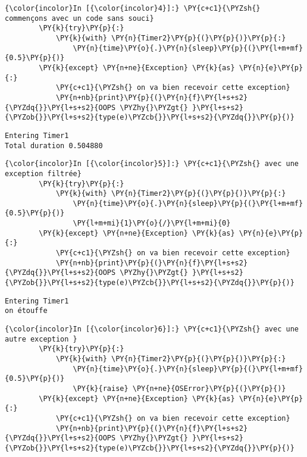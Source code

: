     \begin{Verbatim}[commandchars=\\\{\},frame=single,framerule=0.3mm,rulecolor=\color{cellframecolor}]
{\color{incolor}In [{\color{incolor}4}]:} \PY{c+c1}{\PYZsh{} commençons avec un code sans souci}
        \PY{k}{try}\PY{p}{:}
            \PY{k}{with} \PY{n}{Timer2}\PY{p}{(}\PY{p}{)}\PY{p}{:}
                \PY{n}{time}\PY{o}{.}\PY{n}{sleep}\PY{p}{(}\PY{l+m+mf}{0.5}\PY{p}{)}
        \PY{k}{except} \PY{n+ne}{Exception} \PY{k}{as} \PY{n}{e}\PY{p}{:}
            \PY{c+c1}{\PYZsh{} on va bien recevoir cette exception}
            \PY{n+nb}{print}\PY{p}{(}\PY{n}{f}\PY{l+s+s2}{\PYZdq{}}\PY{l+s+s2}{OOPS \PYZhy{}\PYZgt{} }\PY{l+s+s2}{\PYZob{}}\PY{l+s+s2}{type(e)\PYZcb{}}\PY{l+s+s2}{\PYZdq{}}\PY{p}{)}
\end{Verbatim}


    \begin{Verbatim}[commandchars=\\\{\},frame=single,framerule=0.3mm,rulecolor=\color{cellframecolor}]
Entering Timer1
Total duration 0.504880
\end{Verbatim}

    \begin{Verbatim}[commandchars=\\\{\},frame=single,framerule=0.3mm,rulecolor=\color{cellframecolor}]
{\color{incolor}In [{\color{incolor}5}]:} \PY{c+c1}{\PYZsh{} avec une exception filtrée}
        \PY{k}{try}\PY{p}{:}
            \PY{k}{with} \PY{n}{Timer2}\PY{p}{(}\PY{p}{)}\PY{p}{:}
                \PY{n}{time}\PY{o}{.}\PY{n}{sleep}\PY{p}{(}\PY{l+m+mf}{0.5}\PY{p}{)}
                \PY{l+m+mi}{1}\PY{o}{/}\PY{l+m+mi}{0}
        \PY{k}{except} \PY{n+ne}{Exception} \PY{k}{as} \PY{n}{e}\PY{p}{:}
            \PY{c+c1}{\PYZsh{} on va bien recevoir cette exception}
            \PY{n+nb}{print}\PY{p}{(}\PY{n}{f}\PY{l+s+s2}{\PYZdq{}}\PY{l+s+s2}{OOPS \PYZhy{}\PYZgt{} }\PY{l+s+s2}{\PYZob{}}\PY{l+s+s2}{type(e)\PYZcb{}}\PY{l+s+s2}{\PYZdq{}}\PY{p}{)}
\end{Verbatim}


    \begin{Verbatim}[commandchars=\\\{\},frame=single,framerule=0.3mm,rulecolor=\color{cellframecolor}]
Entering Timer1
on étouffe
\end{Verbatim}

    \begin{Verbatim}[commandchars=\\\{\},frame=single,framerule=0.3mm,rulecolor=\color{cellframecolor}]
{\color{incolor}In [{\color{incolor}6}]:} \PY{c+c1}{\PYZsh{} avec une autre exception }
        \PY{k}{try}\PY{p}{:}
            \PY{k}{with} \PY{n}{Timer2}\PY{p}{(}\PY{p}{)}\PY{p}{:}
                \PY{n}{time}\PY{o}{.}\PY{n}{sleep}\PY{p}{(}\PY{l+m+mf}{0.5}\PY{p}{)}
                \PY{k}{raise} \PY{n+ne}{OSError}\PY{p}{(}\PY{p}{)}
        \PY{k}{except} \PY{n+ne}{Exception} \PY{k}{as} \PY{n}{e}\PY{p}{:}
            \PY{c+c1}{\PYZsh{} on va bien recevoir cette exception}
            \PY{n+nb}{print}\PY{p}{(}\PY{n}{f}\PY{l+s+s2}{\PYZdq{}}\PY{l+s+s2}{OOPS \PYZhy{}\PYZgt{} }\PY{l+s+s2}{\PYZob{}}\PY{l+s+s2}{type(e)\PYZcb{}}\PY{l+s+s2}{\PYZdq{}}\PY{p}{)}
\end{Verbatim}


